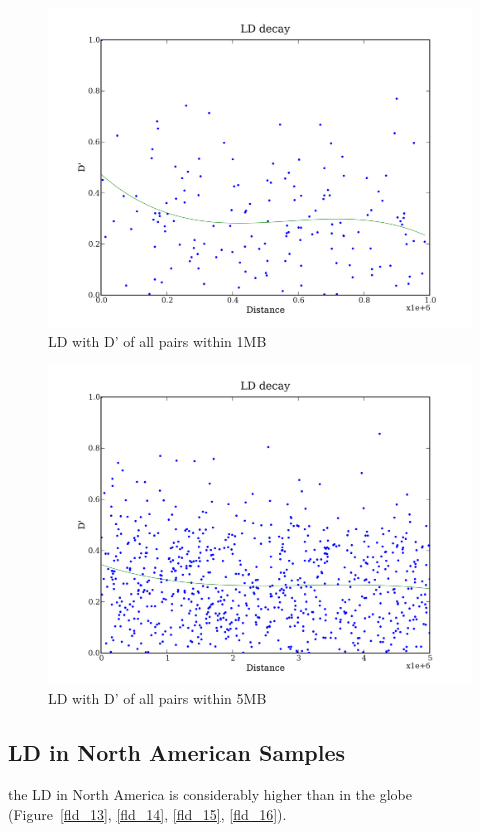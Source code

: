 \documentclass[a4paper,10pt]{article}
\begin{document}
\begin{figure}
\includegraphics[width=1\textwidth]{figures/data_d110_c0_5_LD_D_prime_1000000.png}
\caption{LD with D' of all pairs within 1MB}\label{fld_11}
\end{figure}

\begin{figure}
\includegraphics[width=1\textwidth]{figures/data_d110_c0_5_LD_D_prime_5000000.png}
\caption{LD with D' of all pairs within 5MB}\label{fld_12}
\end{figure}

\subsection{LD in North American Samples}
the LD in North America is considerably higher than in the globe (Figure~\ref{fld_13}, \ref{fld_14}, \ref{fld_15}, \ref{fld_16}).
\end{document}
